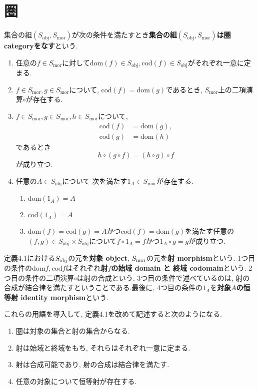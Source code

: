 \section{圏}
\begin{Def}
集合の組$(S_{\mathrm{obj}},S_{\mathrm{mor}})$が次の条件を満たすとき{\bf 集合の組$(S_{\mathrm{obj}},S_{\mathrm{mor}})$は圏 categoryをなす}という.
\begin{enumerate}
\item 任意の$f\in S_\mathrm{mor}$に対して$\mathrm{dom}(f)\in S_\mathrm{obj},\mathrm{cod}(f)\in S_\mathrm{obj}$がそれぞれ一意に定まる.
\item $f\in S_{\mathrm{mor}},g\in S_{\mathrm{mor}}$について,
$\mathrm{cod}(f)=\mathrm{dom}(g)$であるとき,
$S_{\mathrm{mor}}$上の二項演算$\circ$が存在する.
\item $f\in S_{\mathrm{mor}},g\in S_{\mathrm{mor}},h\in S_{\mathrm{mor}}$について, \begin{align*}
\mathrm{cod}(f)&=\mathrm{dom}(g),\\ \mathrm{cod}(g)&=\mathrm{dom}(h)
\end{align*}であるとき
\[
h\circ(g\circ f)=(h\circ g)\circ f
\]
が成り立つ.
\item 任意の$A\in S_{\mathrm{obj}}$について
次を満たす$1_A\in S_{\mathrm{mor}}$が存在する.
\begin{enumerate}
\item
$\mathrm{dom}(1_{A})=A$
\item
$\mathrm{cod}(1_A)=A$
\item $\mathrm{dom}(f)=\mathrm{cod} (g)=A$かつ$\mathrm{cod} (f)=\mathrm{dom}(g)$を満たす任意の$(f,g)\in S_{\mathrm{obj}}\times S_{\mathrm{obj}}$について$f\circ 1_A=f$かつ$1_A\circ g=g$が成り立つ.
\end{enumerate}
\end{enumerate}
\end{Def}
定義4.1における$S_{\rm obj}$の元を{\bf 対象 object}, $S_{\rm mor}$の元を{\bf 射 morphism}という.
1つ目の条件の$\mathrm{dom} f,\mathrm{cod} f$はそれぞれ{\bf 射$f$の始域 domain と 終域 codomain}という. 2つ目の条件の二項演算$\circ$は射の合成という. 3つ目の条件で述べているのは, 射の合成が結合律を満たすということである.最後に, 4つ目の条件の$1_A$を{\bf 対象$A$の恒等射 identity morphism}という.

これらの用語を導入して, 定義4.1を改めて記述すると次のようになる.
\begin{enumerate}
\item
圏は対象の集合と射の集合からなる.
\item
射は始域と終域をもち, それらはそれぞれ一意に定まる.
\item
射は合成可能であり, 射の合成は結合律を満たす.
\item
任意の対象について恒等射が存在する.
\end{enumerate}

